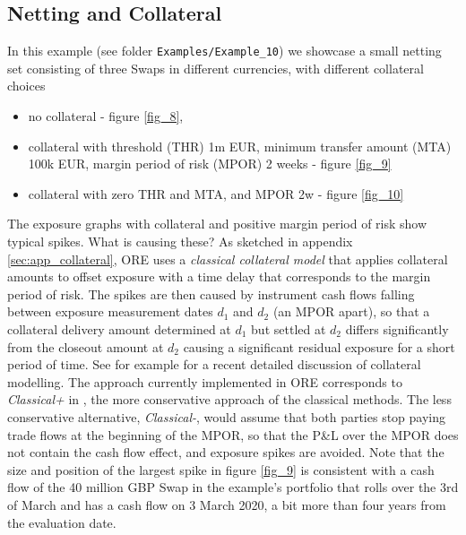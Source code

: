 \documentclass[12pt, a4paper]{article}
\begin{document}
\subsection{Netting and Collateral}

In this example (see folder {\tt Examples/Example\_10}) we showcase a small netting set consisting of three Swaps in
different currencies, with different collateral choices
\begin{itemize}
\item no collateral - figure \ref{fig_8},
\item collateral with threshold (THR) 1m EUR, minimum transfer amount (MTA) 100k EUR, margin period of risk (MPOR) 2
  weeks - figure \ref{fig_9}
\item collateral with zero THR and MTA, and MPOR 2w - figure \ref{fig_10}
\end{itemize}
The exposure graphs with collateral and positive margin period of risk show typical spikes. What is causing these? As
sketched in appendix \ref{sec:app_collateral}, ORE uses a {\em classical collateral model} that applies collateral
amounts to offset exposure with a time delay that corresponds to the margin period of risk. The spikes are then caused
by instrument cash flows falling between exposure measurement dates $d_1$ and $d_2$ (an MPOR apart), so that a
collateral delivery amount determined at $d_1$ but settled at $d_2$ differs significantly from the closeout amount at
$d_2$ causing a significant residual exposure for a short period of time. See for example \cite{Andersen2016} for a
recent detailed discussion of collateral modelling. The approach currently implemented in ORE corresponds to {\em
  Classical+} in \cite{Andersen2016}, the more conservative approach of the classical methods. The less conservative
alternative, {\em Classical-}, would assume that both parties stop paying trade flows at the beginning of the MPOR, so
that the P\&L over the MPOR does not contain the cash flow effect, and exposure spikes are avoided. Note that the size
and position of the largest spike in figure \ref{fig_9} is consistent with a cash flow of the 40 million GBP Swap in the
example's portfolio that rolls over the 3rd of March and has a cash flow on 3 March 2020, a bit more than four years
from the evaluation date.
  
\end{document}
